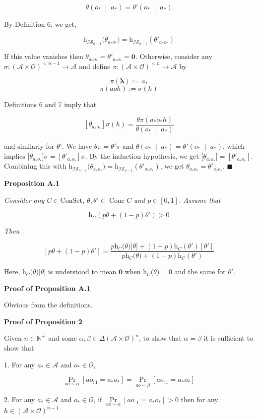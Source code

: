 \documentclass[a4paper]{article}
\newcommand{\Co}[1]{}
\newcommand{\AP}[1]{\left(#1\right)}
\newcommand{\AB}[1]{\left[#1\right]}
\newcommand{\APM}[2]{\left(#1\;\middle\vert\;#2\right)}
\newcommand{\Pa}[2]{\underset{#1}{\operatorname{Pr}}\AB{#2}}
\newcommand{\Nats}{\mathbb{N}}
\newcommand{\Estr}{\boldsymbol{\lambda}} %
\newcommand{\A}{\mathcal{A}}
\newcommand{\Ob}{\mathcal{O}}
\newcommand{\AO}{\AP{\A\times\Ob}}
\newcommand{\Con}{{\boldsymbol{\mathrm{ConSet}}}}
\DeclareMathOperator{\Cone}{Cone}
\newcommand{\Ht}{\mathrm{h}}
\newcommand{\IS}{\mathcal{IS}}
\begin{document}
$$\theta\APM{o_*}{a_*}=\theta'\APM{o_*}{a_*}$$

By Definition 6, we get,

$$\Ht_{\IS_{n-1}}\big(\theta_{a_*o_*}\big)=\Ht_{\IS_{n-1}}\AP{\theta'_{a_*o_*}}$$

If this value vanishes then $\theta_{a_*o_*}=\theta'_{a_*o_*}=\boldsymbol{0}$. Otherwise, consider any $\sigma:\AO^{<n-1}\rightarrow\A$ and define $\pi:\AO^{<n}\rightarrow\A$ by

$$\pi(\Estr):=a_*$$
$$\pi(aoh):=\sigma(h)$$

Definitions 6 and 7 imply that

$$\AB{\theta_{a_*o_*}}\sigma(h)=\frac{\theta\pi(a_*o_*h)}{\theta\APM{o_*}{a_*}}$$

and similarly for $\theta'$. We have $\theta\pi=\theta'\pi$ and $\theta\APM{o_*}{a_*}=\theta'\APM{o_*}{a_*}$, which implies $\Big[\theta_{a_*o_*}\Big]\sigma=\AB{\theta'_{a_*o_*}}\sigma$. By the induction hypothesis, we get $\big[\theta_{a_*o_*}\big]=\AB{\theta'_{a_*o_*}}$. Combining this with $\Ht_{\IS_{n-1}}\big(\theta_{a_*o_*}\big)=\Ht_{\IS_{n-1}}\AP{\theta'_{a_*o_*}}$, we get $\theta_{a_*o_*}=\theta'_{a_*o_*}$. $\blacksquare$

\textbf{Proposition A.1}\Co{b}

\textit{Consider any $C\in\Con$, $\theta,\theta'\in\Cone{C}$ and $p\in[0,1]$. Assume that}\Co{i} 

$$\Ht_C\AP{p\theta+(1-p)\theta'}>0$$

\textit{Then}\Co{i}

$$\AB{p\theta+(1-p)\theta'}=\frac{p\Ht_C\big(\theta\big)\big[\theta\big]+(1-p)\Ht_C\AP{\theta'}\AB{\theta'}}{p\Ht_C\big(\theta\big)+(1-p)\Ht_C\AP{\theta'}}$$

Here, $\Ht_C\big(\theta\big)\big[\theta\big]$ is understood to mean $\boldsymbol{0}$ when $\Ht_C\big(\theta\big)=0$ and the same for $\theta'$.

\textbf{Proof of Proposition A.1}\Co{b}

Obvious from the definitions.

\textbf{Proof of Proposition 2}\Co{b}

Given $n\in\Nats^+$ and some $\alpha,\beta\in\Delta\AO^n$, to show that $\alpha=\beta$ it is sufficient to show that

1. For any $a_*\in\A$ and $o_*\in\Ob$, 

$$\Pa{ao\sim\alpha}{ao_{:1}=a_*o_*}=\Pa{ao\sim\beta}{ao_{:1}=a_*o_*}$$

2. For any $a_*\in\A$ and $o_*\in\Ob$, if $\Pa{ao\sim\alpha}{ao_{:1}=a_*o_*}>0$ then for any $h\in\AO^{n-1}$
\end{document}
